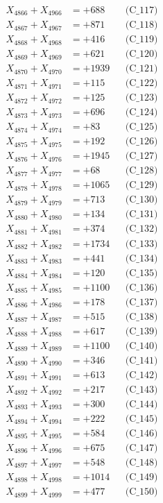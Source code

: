 \documentclass[a4paper,10pt]{article}
\begin{document}
{\begin{align}
X_{4866} + X_{4966} &= +688 && \text{(C\_117)} \\
X_{4867} + X_{4967} &= +871 && \text{(C\_118)} \\
X_{4868} + X_{4968} &= +416 && \text{(C\_119)} \\
X_{4869} + X_{4969} &= +621 && \text{(C\_120)} \\
\allowbreak
X_{4870} + X_{4970} &= +1939 && \text{(C\_121)} \\
X_{4871} + X_{4971} &= +115 && \text{(C\_122)} \\
X_{4872} + X_{4972} &= +125 && \text{(C\_123)} \\
X_{4873} + X_{4973} &= +696 && \text{(C\_124)} \\
X_{4874} + X_{4974} &= +83 && \text{(C\_125)} \\
\allowbreak
X_{4875} + X_{4975} &= +192 && \text{(C\_126)} \\
X_{4876} + X_{4976} &= +1945 && \text{(C\_127)} \\
X_{4877} + X_{4977} &= +68 && \text{(C\_128)} \\
X_{4878} + X_{4978} &= +1065 && \text{(C\_129)} \\
X_{4879} + X_{4979} &= +713 && \text{(C\_130)} \\
\allowbreak
X_{4880} + X_{4980} &= +134 && \text{(C\_131)} \\
X_{4881} + X_{4981} &= +374 && \text{(C\_132)} \\
X_{4882} + X_{4982} &= +1734 && \text{(C\_133)} \\
X_{4883} + X_{4983} &= +441 && \text{(C\_134)} \\
X_{4884} + X_{4984} &= +120 && \text{(C\_135)} \\
\allowbreak
X_{4885} + X_{4985} &= +1100 && \text{(C\_136)} \\
X_{4886} + X_{4986} &= +178 && \text{(C\_137)} \\
X_{4887} + X_{4987} &= +515 && \text{(C\_138)} \\
X_{4888} + X_{4988} &= +617 && \text{(C\_139)} \\
X_{4889} + X_{4989} &= +1100 && \text{(C\_140)} \\
\allowbreak
X_{4890} + X_{4990} &= +346 && \text{(C\_141)} \\
X_{4891} + X_{4991} &= +613 && \text{(C\_142)} \\
X_{4892} + X_{4992} &= +217 && \text{(C\_143)} \\
X_{4893} + X_{4993} &= +300 && \text{(C\_144)} \\
X_{4894} + X_{4994} &= +222 && \text{(C\_145)} \\
\allowbreak
X_{4895} + X_{4995} &= +584 && \text{(C\_146)} \\
X_{4896} + X_{4996} &= +675 && \text{(C\_147)} \\
X_{4897} + X_{4997} &= +548 && \text{(C\_148)} \\
X_{4898} + X_{4998} &= +1014 && \text{(C\_149)} \\
X_{4899} + X_{4999} &= +477 && \text{(C\_150)} \\
\end{align}
}
\end{document}
